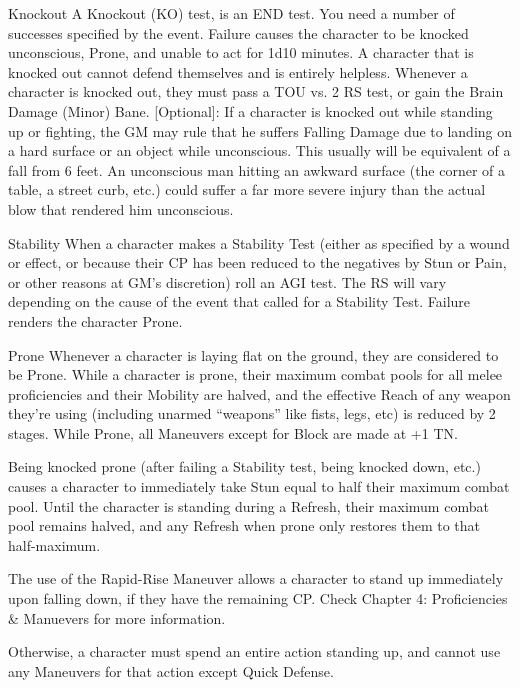 \documentclass[oneside,11pt,english]{book}
\begin{document}
Knockout 
A Knockout (KO) test, is an END test. You need a number of successes specified by the event. Failure 
causes the character to be knocked unconscious, Prone, and unable to act for 1d10 minutes. A character 
that is knocked out cannot defend themselves and is entirely helpless. Whenever a character is knocked 
out, they must pass a TOU vs. 2 RS test, or gain the Brain Damage (Minor) Bane. 
[Optional]: If a character is knocked out while standing up or fighting, the GM may rule that he suffers 
Falling Damage due to landing on a hard surface or an object while unconscious. This usually will be 
equivalent of a fall from 6 feet. An unconscious man hitting an awkward surface (the corner of a table, a 
street curb, etc.) could suffer a far more severe injury than the actual blow that rendered him unconscious. 

 

Stability 
When a character makes a Stability Test (either as specified by a wound or effect, or because their CP has 
been reduced to the negatives by Stun or Pain, or other reasons at GM’s discretion) roll an AGI test. The 
RS will vary depending on the cause of the event that called for a Stability Test. Failure renders the 
character Prone. 

 

Prone 
Whenever a character is laying flat on the ground, they are considered to be Prone. While a character is 
prone, their maximum combat pools for all melee proficiencies and their Mobility are halved, and the 
effective Reach of any weapon they’re using (including unarmed “weapons” like fists, legs, etc) is 
reduced by 2 stages. While Prone, all Maneuvers except for Block are made at +1 TN. 

 

Being knocked prone (after failing a Stability test, being knocked down, etc.) causes a character to 
immediately take Stun equal to half their maximum combat pool. Until the character is standing during a 
Refresh, their maximum combat pool remains halved, and any Refresh when prone only restores them to 
that half-maximum. 

 

The use of the Rapid-Rise Maneuver allows a character to stand up immediately upon falling down, if 
they have the remaining CP. Check Chapter 4: Proficiencies \& Manuevers for more information. 


Otherwise, a character must spend an entire action standing up, and cannot use any Maneuvers for that 
action except Quick Defense. 
\end{document}
